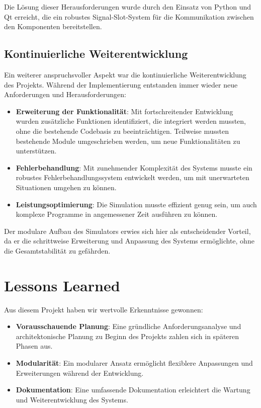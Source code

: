 Die Lösung dieser Herausforderungen wurde durch den Einsatz von Python und Qt erreicht, die ein robustes Signal-Slot-System für die Kommunikation zwischen den Komponenten bereitstellen.

\subsection{Kontinuierliche Weiterentwicklung}

Ein weiterer anspruchsvoller Aspekt war die kontinuierliche Weiterentwicklung des Projekts. Während der Implementierung entstanden immer wieder neue Anforderungen und Herausforderungen:

\begin{itemize}
    \item \textbf{Erweiterung der Funktionalität}: Mit fortschreitender Entwicklung wurden zusätzliche Funktionen identifiziert, die integriert werden mussten, ohne die bestehende Codebasis zu beeinträchtigen. Teilweise mussten bestehende Module umgeschrieben werden, um neue Funktionalitäten zu unterstützen.
    \item \textbf{Fehlerbehandlung}: Mit zunehmender Komplexität des Systems musste ein robustes Fehlerbehandlungssystem entwickelt werden, um mit unerwarteten Situationen umgehen zu können.
    \item \textbf{Leistungsoptimierung}: Die Simulation musste effizient genug sein, um auch komplexe Programme in angemessener Zeit ausführen zu können.
\end{itemize}

Der modulare Aufbau des Simulators erwies sich hier als entscheidender Vorteil, da er die schrittweise Erweiterung und Anpassung des Systems ermöglichte, ohne die Gesamtstabilität zu gefährden.

\section{Lessons Learned}

Aus diesem Projekt haben wir wertvolle Erkenntnisse gewonnen:

\begin{itemize}
    \item \textbf{Vorausschauende Planung}: Eine gründliche Anforderungsanalyse und architektonische Planung zu Beginn des Projekts zahlen sich in späteren Phasen aus.
    \item \textbf{Modularität}: Ein modularer Ansatz ermöglicht flexiblere Anpassungen und Erweiterungen während der Entwicklung. 
    \item \textbf{Dokumentation}: Eine umfassende Dokumentation erleichtert die Wartung und Weiterentwicklung des Systems.
\end{itemize}

